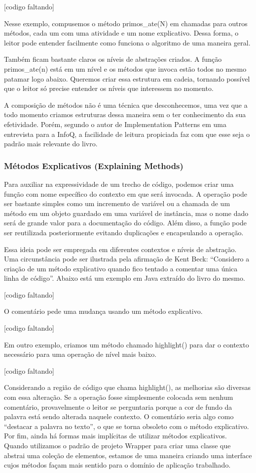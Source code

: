 [codigo faltando]

	Nesse exemplo, compusemos o método primos_ate(N) em chamadas para outros métodos, cada um com uma atividade e um nome explicativo. Dessa forma, o leitor pode entender facilmente como funciona o algoritmo de uma maneira geral. 
	
	Também ficam bastante claros os níveis de abstrações criados. A função primos_ate(n) está em um nível e os métodos que invoca estão todos no mesmo patamar logo abaixo. Queremos criar essa estrutura em cadeia, tornando possível que o leitor só precise entender os níveis que interessem no momento.
	
	A composição de métodos não é uma técnica que desconhecemos, uma vez que a todo momento criamos estruturas dessa maneira sem o ter conhecimento da sua efetividade. Porém, segundo o autor de Implementation Patterns em uma entrevista para a InfoQ, a facilidade de leitura propiciada faz com que esse seja o padrão mais relevante do livro. 	

\subsubsection{Métodos Explicativos (Explaining Methods)}
	Para auxiliar na expressividade de um trecho de código, podemos criar uma função com nome específico do contexto em que será invocada. A operação pode ser bastante simples como um incremento de variável ou a chamada de um método em um objeto guardado em uma variável de instância, mas o nome dado será de grande valor para a documentação do código. Além disso, a função pode ser reutilizada posteriormente evitando duplicações e encapsulando a operação.
	
	Essa ideia pode ser empregada em diferentes contextos e níveis de abstração. Uma circunstância pode ser ilustrada pela afirmação de Kent Beck: “Considero a criação de um método explicativo quando fico tentado a comentar uma única linha de código”. Abaixo está um exemplo em Java extraído do livro do mesmo.

[codigo faltando]

	O comentário pede uma mudança usando um método explicativo.
	
[codigo faltando]

	Em outro exemplo, criamos um método chamado highlight() para dar o contexto necessário para uma operação de nível mais baixo. 

[codigo faltando]

	Considerando a região de código que chama highlight(), as melhorias são diversas com essa alteração.  Se a operação fosse simplesmente colocada sem nenhum comentário, provavelmente o leitor se perguntaria porque a cor de fundo da palavra está sendo alterada naquele contexto. O comentário seria algo como “destacar a palavra no texto”, o que se torna obsoleto com o método explicativo. 
	Por fim, ainda há formas mais implícitas de utilizar métodos explicativos. Quando utilizamos o padrão de projeto Wrapper para criar uma classe que abstrai uma coleção de elementos, estamos de uma maneira criando uma interface cujos métodos façam mais sentido para o domínio de aplicação trabalhado.


